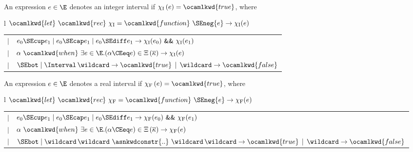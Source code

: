\begin{Def}
An expression $e \in \E$ denotes an integer interval if
$\chi_{\textnormal{I}} \, (e) = \ocamlkwd{true}$,
where

\medskip

\noindent
\begin{tabular}{l}
  $\ocamlkwd{let} \,\, \ocamlkwd{rec} \,\, \chi_{\textnormal{I}}
   = \ocamlkwd{function} \,\, \SEneg{e} \rightarrow
   \chi_{\textnormal{I}} (e)$\\
  \begin{tabular}{ll}
      $\mid$
    & \hspace*{-4mm}
      $e_0 \SEcup e_1 \mid e_0 \SEcap e_1 \mid e_0 
      \SEdiff e_1 \rightarrow \chi_{\textnormal{I}} (e_0)
      \,\, \textsf{\small \&\&} \,\, \chi_{\textnormal{I}} (e_1)$\\
      $\mid$
    & \hspace*{-4mm}
      $\alpha \,\, \ocamlkwd{when} \,\, \exists e \in \E.(\alpha \CEeq
       e) \in \Xi \, (\overline{\kappa}) \rightarrow
       \chi_{\textnormal{I}} (e)$\\
      $\mid$
    & \hspace*{-4mm}
      $\SEbot \mid \Interval \, \wildcard
       \rightarrow \ocamlkwd{true} \, \mid \,
       \wildcard \rightarrow \ocamlkwd{false}$
  \end{tabular}
\end{tabular}

\end{Def}

\begin{Def}
An expression $e \in \E$ denotes a real interval if
$\chi_{\textnormal{F}} \, (e) = \ocamlkwd{true}$, where

\medskip

\noindent
\begin{tabular}{l}
  $\ocamlkwd{let} \,\, \ocamlkwd{rec} \,\, \chi_{\textnormal{F}}
   = \ocamlkwd{function} \,\, \SEneg{e} \rightarrow
   \chi_{\textnormal{F}} (e)$\\
  \begin{tabular}{ll}
      $\mid$
    & \hspace*{-4mm}
      $e_0 \SEcup e_1 \mid e_0 \SEcap e_1 \mid e_0 
      \SEdiff e_1 \rightarrow \chi_{\textnormal{F}} (e_0)
      \,\, \textsf{\small \&\&} \,\, \chi_{\textnormal{F}} (e_1)$\\
      $\mid$
    & \hspace*{-4mm}
      $\alpha \,\, \ocamlkwd{when} \,\, \exists e \in \E.(\alpha \CEeq
       e) \in \Xi \, (\overline{\kappa}) \rightarrow
       \chi_{\textnormal{F}} (e)$\\
      $\mid$
    & \hspace*{-4mm}
      $\SEbot \mid \wildcard \, \wildcard \,\, 
      \asnkwdconstr{..} \,\, \wildcard \, \wildcard 
      \rightarrow \ocamlkwd{true} \, \mid \,
      \wildcard \rightarrow \ocamlkwd{false}$
  \end{tabular}
\end{tabular}

\end{Def}

